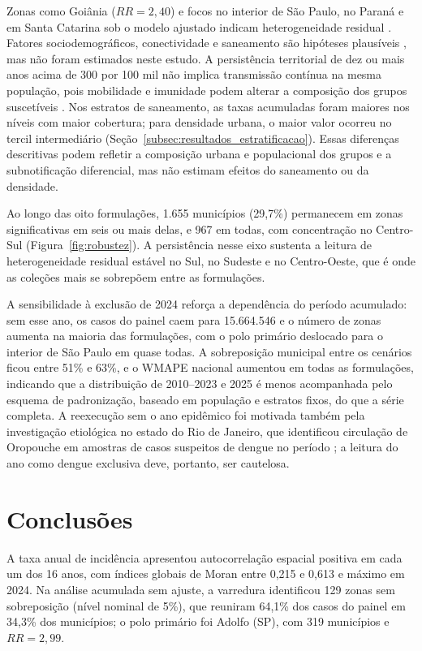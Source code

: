 Zonas como Goiânia ($RR = 2{,}40$) e focos no interior de São Paulo, no Paraná e em Santa Catarina sob o modelo ajustado indicam heterogeneidade residual \cite{lee2021}. Fatores sociodemográficos, conectividade e saneamento são hipóteses plausíveis \cite{power2022,cardim2025}, mas não foram estimados neste estudo. A persistência territorial de dez ou mais anos acima de 300 por 100 mil não implica transmissão contínua na mesma população, pois mobilidade e imunidade podem alterar a composição dos grupos suscetíveis \cite{santos2019persistencia}. Nos estratos de saneamento, as taxas acumuladas foram maiores nos níveis com maior cobertura; para densidade urbana, o maior valor ocorreu no tercil intermediário (Seção~\ref{subsec:resultados_estratificacao}). Essas diferenças descritivas podem refletir a composição urbana e populacional dos grupos e a subnotificação diferencial, mas não estimam efeitos do saneamento ou da densidade.

Ao longo das oito formulações, 1.655 municípios (29,7\%) permanecem em zonas significativas em seis ou mais delas, e 967 em todas, com concentração no Centro-Sul (Figura~\ref{fig:robustez}). A persistência nesse eixo sustenta a leitura de heterogeneidade residual estável no Sul, no Sudeste e no Centro-Oeste, que é onde as coleções mais se sobrepõem entre as formulações.

A sensibilidade à exclusão de 2024 reforça a dependência do período acumulado: sem esse ano, os casos do painel caem para 15.664.546 e o número de zonas aumenta na maioria das formulações, com o polo primário deslocado para o interior de São Paulo em quase todas. A sobreposição municipal entre os cenários ficou entre 51\% e 63\%, e o WMAPE nacional aumentou em todas as formulações, indicando que a distribuição de 2010--2023 e 2025 é menos acompanhada pelo esquema de padronização, baseado em população e estratos fixos, do que a série completa. A reexecução sem o ano epidêmico foi motivada também pela investigação etiológica no estado do Rio de Janeiro, que identificou circulação de Oropouche em amostras de casos suspeitos de dengue no período \cite{costa2025oropouche}; a leitura do ano como dengue exclusiva deve, portanto, ser cautelosa.

\section{Conclusões}
\label{cap:conclusoes}

A taxa anual de incidência apresentou autocorrelação espacial positiva em cada um dos 16 anos, com índices globais de Moran entre 0,215 e 0,613 e máximo em 2024. Na análise acumulada sem ajuste, a varredura identificou 129 zonas sem sobreposição (nível nominal de 5\%), que reuniram 64,1\% dos casos do painel em 34,3\% dos municípios; o polo primário foi Adolfo (SP), com 319 municípios e $RR = 2{,}99$.

